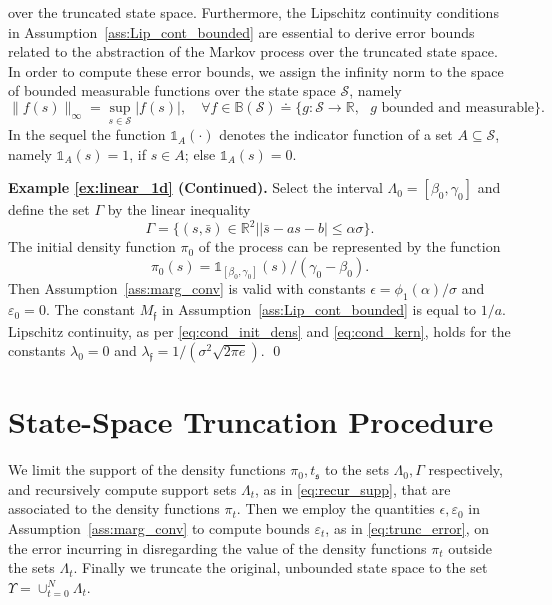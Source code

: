 \documentclass{LMCS}
\begin{document}
over the truncated state space. 
Furthermore, 
the Lipschitz continuity conditions in Assumption~\ref{ass:Lip_cont_bounded} are essential to derive error bounds related to the abstraction of the Markov process over the truncated state space. 
In order to compute these error bounds, 
we assign the infinity norm to the space of bounded measurable functions over the state space $\mathcal S$, namely 
\begin{equation*}
\|f(s)\|_{\infty} =\sup_{s\in\mathcal S}|f(s)|, \quad \forall f\in
\mathbb B(\mathcal S)\doteq\{g:\mathcal S\rightarrow\mathbb R,\text{ }g\text{ bounded and measurable}\}.
\end{equation*} 
In the sequel the function $\mathds 1_{A}(\cdot)$ denotes the indicator function of a set $A \subseteq \mathcal S$, 
namely $\mathds 1_{A}(s) = 1$, if $s \in A$; else $\mathds 1_{A}(s) = 0$. 

\medskip

\textbf{Example \ref{ex:linear_1d} (Continued).}
Select the interval $\Lambda_0 = [\beta_0,\gamma_0]$ and define the set $\varGamma$ by the linear inequality
\begin{equation*}
\varGamma = \{(s,\bar s)\in\mathbb R^2\big| |\bar s-as-b|\le\alpha\sigma\}.
\end{equation*}
The initial density function $\pi_0$ of the process can be represented by the function 
\begin{equation*}
\pi_0(s)=\mathds 1_{[\beta_0,\gamma_0]}(s)/(\gamma_0-\beta_0).
\end{equation*}
Then Assumption~\ref{ass:marg_conv} is valid with constants $\epsilon = \phi_1(\alpha)/\sigma$ and $\varepsilon_0=0$.
The constant $M_{\mathfrak f}$ in Assumption~\ref{ass:Lip_cont_bounded} is equal to $1/a$.
Lipschitz continuity, as per \eqref{eq:cond_init_dens} and \eqref{eq:cond_kern},
holds for the constants $\lambda_0 = 0$ and $\lambda_{\mathfrak f} = 1/\left(\sigma^2\sqrt{2\pi e}\right)$. 
\hfill \qed

\section{State-Space Truncation Procedure}
\label{sec:trunc}

We limit the support of the density functions $\pi_0,t_{\mathfrak s}$ to the sets $\Lambda_0,\varGamma$ respectively, 
and recursively compute support sets $\Lambda_t$, as in \eqref{eq:recur_supp}, 
that are associated to the density functions $\pi_t$. 
Then we employ the quantities $\epsilon,\varepsilon_0$ in Assumption~\ref{ass:marg_conv} 
to compute bounds $\varepsilon_t$, as in \eqref{eq:trunc_error}, 
on the error incurring in disregarding the value of the density functions $\pi_t$ outside the sets $\Lambda_t$. 
Finally we truncate the original, unbounded state space to the set $\Upsilon = \cup_{t=0}^N\Lambda_t$.  
\end{document}
